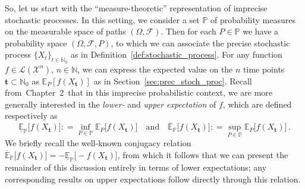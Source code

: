 \documentclass[graybox]{svmult}
\newcommand{\nats}{\mathbb{N}}
\newcommand{\natswith}{\nats_{0}}
\newcommand{\states}{\mathcal{X}}
\newcommand{\gambles}{\mathcal{L}}
\newcommand{\coloneqq}{:\!=}
\def\refIPChapter{Chapter~2}
\begin{document}
So, let us start with the ``measure-theoretic'' representation of imprecise stochastic processes. In this setting, we consider a set $\mathbb{P}$ of probability measures on the measurable space of paths $(\Omega,\mathcal{F})$. Then for each $P\in\mathbb{P}$ we have a probability space $(\Omega,\mathcal{F},P)$, to which we can associate the precise stochastic process $\{X_t\}_{t\in\natswith}$ as in Definition~\ref{def:stochastic_process}. For any function $f\in\gambles(\states^n)$, $n\in\nats$, we can express the expected value on the $n$ time points $\mathbf{t}\subset\natswith$ as $\mathbb{E}_P[f(X_\mathbf{t})]$ as in Section~\ref{sec:prec_stoch_proc}. Recall from~\refIPChapter~that in this imprecise probabilistic context, we are more generally interested in the \emph{lower-} and \emph{upper expectation} of $f$, which are defined respectively as
\begin{equation*}
\underline{\mathbb{E}}_\mathbb{P}\bigl[f(X_\mathbf{t})\bigr] \coloneqq \inf_{P\in\mathbb{P}} \mathbb{E}_P\bigl[f(X_\mathbf{t})\bigr]\quad\text{and}\quad \overline{\mathbb{E}}_\mathbb{P}\bigl[f(X_\mathbf{t})\bigr] \coloneqq \sup_{P\in\mathbb{P}} \mathbb{E}_P\bigl[f(X_\mathbf{t})\bigr]\,.
\end{equation*}
We briefly recall the well-known conjugacy relation $\overline{\mathbb{E}}_\mathbb{P}\bigl[f(X_\mathbf{t})\bigr]=-\underline{\mathbb{E}}_\mathbb{P}\bigl[-f(X_\mathbf{t})\bigr]$, from which it follows that we can present the remainder of this discussion entirely in terms of lower expectations; any corresponding results on upper expectations follow directly through this relation.
\end{document}
